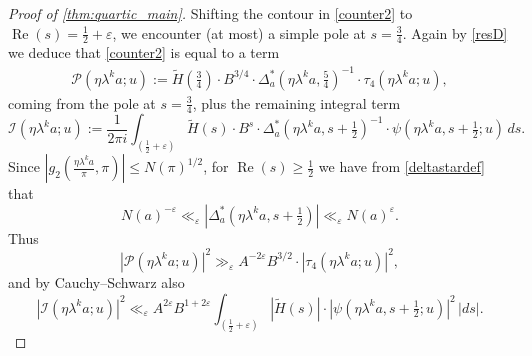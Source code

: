 \documentclass[12pt,reqno]{amsart}
\numberwithin{equation}{section}
\renewcommand{\Re}{\operatorname{Re}}
\begin{document}
\begin{proof}[Proof of \cref{thm:quartic_main}]
    Shifting the contour in \eqref{counter2} to $\Re(s)=\frac{1}{2}+\varepsilon$, we encounter (at most) a simple pole at $s=\frac{3}{4}$. Again by \eqref{resD} we deduce that \eqref{counter2} is equal to a term
    \begin{align}  \label{bias}
        \mathcal{P}(\eta \lambda^k a; u) := \widetilde{H}(\tfrac{3}{4}) \cdot B^{3/4} \cdot \Delta^{*}_{a}(\eta \lambda^k a, \tfrac{5}{4})^{-1} \cdot \tau_4(\eta \lambda^k a; u),
    \end{align}
    coming from the pole at $s = \frac{3}{4}$, plus the remaining integral term
    \begin{equation}\label{eq:integral_term}
        \mathcal{I}(\eta \lambda^k a; u) := \frac{1}{2 \pi i} \int_{(\frac{1}{2}+\varepsilon)} \widetilde{H}(s) \cdot B^s \cdot \Delta^{*}_{a}(\eta \lambda^k a, s + \tfrac{1}{2})^{-1} \cdot \psi(\eta \lambda^k a, s+\tfrac{1}{2}; u) \, ds.
    \end{equation}
    Since $|{g_2(\frac{\eta \lambda^k a}{\pi}, \pi)}| \leq N(\pi)^{1/2}$, for $\Re(s) \geq \frac{1}{2}$ we have from \eqref{deltastardef} that
    \begin{equation*}
        N(a)^{-\varepsilon} \ll_\varepsilon |{\Delta^{*}_{a}(\eta \lambda^k a, s + \tfrac{1}{2})}| \ll_\varepsilon N(a)^{\varepsilon}.
    \end{equation*}
    Thus 
    \begin{equation}\label{eq:P_lower_bd}
        |{\mathcal{P}(\eta \lambda^k a; u)}|^2 \gg_{\varepsilon} A^{-2\varepsilon} B^{3/2} \cdot |{\tau_4(\eta \lambda^k a; u)}|^2,
    \end{equation}
    and by Cauchy--Schwarz also
    \begin{equation}\label{eq:I_upper_bd}
        |{\mathcal{I}(\eta \lambda^k a; u)}|^2 \ll_{\varepsilon} A^{2\varepsilon} B^{1+2\varepsilon} \int_{(\frac{1}{2}+\varepsilon)} |{\widetilde{H}(s)}| \cdot |{\psi(\eta \lambda^k a, s+\tfrac{1}{2}; u)}|^2 \, |{ds}|.
    \end{equation}


\end{proof}
\end{document}
